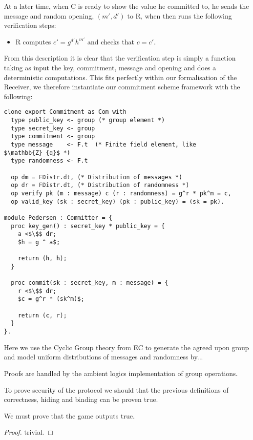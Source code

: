 
At a later time, when C is ready to show the value he committed to, he sends the message and random opening, $(m',d')$ to R, when then runs the following verification steps:
\begin{itemize}
  \item R computes $c' = g^{d'}h^{m'}$ and checks that $c = c'$.
\end{itemize}

From this description it is clear that the verification step is simply a
function taking as input the key, commitment, message and opening and does a
deterministic computations. This fits perfectly within our formalisation of the
Receiver, we therefore instantiate our commitment scheme framework with the
following:

\begin{lstlisting}[mathescape,label=lst:commitment:pedersen,caption=Pedersen instantiation]
clone export Commitment as Com with
  type public_key <- group (* group element *)
  type secret_key <- group
  type commitment <- group
  type message    <- F.t  (* Finite field element, like $\mathbb{Z}_{q}$ *)
  type randomness <- F.t

  op dm = FDistr.dt, (* Distribution of messages *)
  op dr = FDistr.dt, (* Distribution of randomness *)
  op verify pk (m : message) c (r : randomness) = g^r * pk^m = c,
  op valid_key (sk : secret_key) (pk : public_key) = (sk = pk).

module Pedersen : Committer = {
  proc key_gen() : secret_key * public_key = {
    a <$\$$ dr;
    $h = g ^ a$;

    return (h, h);
  }

  proc commit(sk : secret_key, m : message) = {
    r <$\$$ dr;
    $c = g^r * (sk^m)$;

    return (c, r);
  }
}.

\end{lstlisting}

Here we use the Cyclic Group theory from EC to generate the agreed upon group
and model uniform distributions of messages and randomness by...

Proofs are handled by the ambient logics implementation of group operations.

To prove security of the protocol we should that the previous definitions of
correctness, hiding and binding can be proven true.

\begin{lemma}
  We must prove that the game outputs true.
\end{lemma}
\begin{proof}
trivial.
\end{proof}

